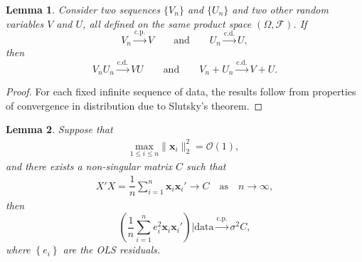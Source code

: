 \documentclass[12pt]{article}
\newcommand{\sumin}{\sum_{i=1}^n} %
\newcommand{\dn}{\dfrac{1}{n}} %
\newcommand{\CONV}[1]{\stackrel{\text{#1}}{\longrightarrow}} %
\newcommand{\x}{\bm{x}_i} %
\newtheorem{lem}{Lemma}[section]
\begin{document}
\begin{lem} \label{lem_slutsky_cd}
	Consider two sequences $\{V_n\}$ and $\{U_n\}$ and two other random variables $V$ and $U$, all defined on the same product space $(\Omega, \mathcal{F})$. If
	$$
	V_n \CONV{c.p.} V 
	\qquad \text{and} \qquad
	U_n \CONV{c.d.} U,
	$$
	then
	$$
	V_n U_n \CONV{c.d.} V U 
	\qquad \text{and} \qquad 
	V_n + U_n \CONV{c.d.} V + U.
	$$
\end{lem} 

\begin{proof}
	For each fixed infinite sequence of data, the results follow from properties of convergence in distribution due to Slutsky's theorem.
\end{proof}

\begin{lem} \label{lem_ave_ei_xi^2} 
	Suppose that  
	\begin{align*}
	\underset{1 \leq i \leq n}{\text{max}} \| \x  \|_2^2 = \mathcal{O} (1), 
	\end{align*}
	and there exists a non-singular matrix $C$ such that
	\begin{align*}
	X'X = \dn \sumin \x \x' \to C 
	\quad \text{as} \quad n \to \infty,
	\end{align*}
	then
	$$
	\left(
		\dn \sumin e_i^2 \x \x'
	\right) \bigg| \text{data}
	\CONV{c.p.} 
	\sigma^2 C, 
	$$
	where $\left\{ e_i \right\}$ are the OLS residuals.
\end{lem}
\end{document}
